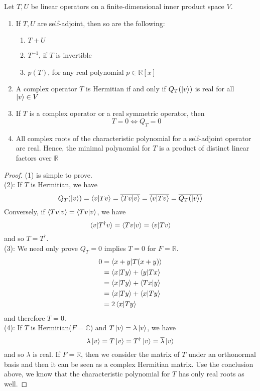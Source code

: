 \documentclass{article}
\begin{document}
\begin{thm}
	Let $T,U$ be linear operators on a finite-dimensional inner product space $V$.
	\begin{enumerate}
		\item If $T,U$ are self-adjoint, then so are the following:
		\begin{enumerate}
			\item $T+U$
			\item $T^{-1}$, if $T$ is invertible
			\item $p(T)$, for any real polynomial $p\in\mathbb{R}[x]$
		\end{enumerate}
		\item A complex operator $T$ is Hermitian if and only if $Q_T(\ket{v})$ is real for all $\ket{v}\in V$
		\item If $T$ is a complex operator or a real symmetric operator, then
		\[T=0\Leftrightarrow Q_T=0\]
		\item All complex roots of the characteristic polynomial for a self-adjoint operator are real. Hence, the minimal polynomial for $T$ is a product of distinct linear factors over $\mathbb{R}$
	\end{enumerate}
\end{thm}
\begin{proof}
	(1) is simple to prove.\\
	(2): If $T$ is Hermitian, we have
	\[Q_T(\ket{v})=\braket{v|Tv}=\overline{\braket{Tv|v}}=\overline{\braket{v|Tv}}=\overline{Q_T(\Ket{v})}\]
	Conversely, if $\braket{Tv|v}=\braket{Tv|v}$, we have
	\[\braket{v|T^\dagger v}=\braket{Tv|v}=\braket{v|Tv}\]
	and so $T=T^\dagger$.\\
	(3): We need only prove $Q_T=0$ implies $T=0$ for $F=\mathbb{R}$.
	\begin{align*}
		0&=\braket{x+y|T(x+y)}\\
		&=\braket{x|Ty}+\braket{y|Tx}\\
		&=\braket{x|Ty}+\braket{Tx|y}\\
		&=\braket{x|Ty}+\braket{x|Ty}\\
		&=2\braket{x|Ty}
	\end{align*}
	and therefore $T=0$.\\
	(4): If $T$ is Hermitian($F=\mathbb{C}$) and $T\ket{v}=\lambda\ket{v}$, we have
	\[\lambda\ket{v}=T\ket{v}=T^\dagger\ket{v}=\overline{\lambda}\ket{v}\]
	and so $\lambda$ is real. If $F=\mathbb{R}$, then we consider the matrix of $T$ under an orthonormal basis and then it can be seen as a complex Hermitian matrix. Use the conclusion above, we know that the characteristic polynomial for $T$ has only real roots as well. 
\end{proof}
\end{document}
